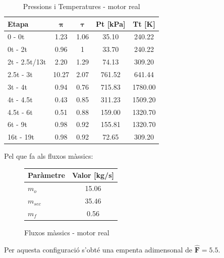 \begin{table}[H]
\centering
\begin{tabular}{lcccc}
\toprule[3pt]
\textbf{Etapa} &\textbf{$\bm{\pi}$} & \textbf{$\bm{\tau}$}    & \textbf{Pt} [kPa]  & \textbf{Tt} [K]  \\
\midrule[1pt]
0 - 0t     & 1.23   & 1.06  & 35.10   & 240.22             \\
0t - 2t     & 0.96   & 1  & 33.70   & 240.22             \\
2t - 2.5t/13t     & 2.20   & 1.29  & 74.13   & 309.20             \\
2.5t - 3t     & 10.27  & 2.07  & 761.52   & 641.44             \\
3t - 4t     & 0.94     & 0.76  & 715.83  & 1780.00             \\
4t - 4.5t     & 0.43   & 0.85  & 311.23   & 1509.20             \\
4.5t - 6t     & 0.51   & 0.88  & 159.00   & 1320.70             \\
6t - 9t     & 0.98   & 0.92  & 155.81   & 1320.70            \\
16t - 19t     & 0.98   & 0.92  & 72.65   & 309.20            \\
\bottomrule[2pt]
\end{tabular}
\caption{Pressions i Temperatures - motor real}
\end{table}
Pel que fa als fluxos màssics:
\begin{figure}[H]
	\centering
	\begin{tabular}{lc}
		\toprule[3pt]
		\textbf{Paràmetre}&\textbf{Valor [kg/s]}\\
		\midrule[1pt]
		$m_{o}$ & 15.06 \\
		$m_{sec}$ & 35.46 \\
		$m_{f}$ & 0.56 \\
		\bottomrule[2pt]
	\end{tabular}
	\label{C_opti2}
	\caption{Fluxos màssics - motor real}
\end{figure}
Per aquesta configuració s'obté una empenta adimensonal de $\bm{\hat{F} = 5.5}$.